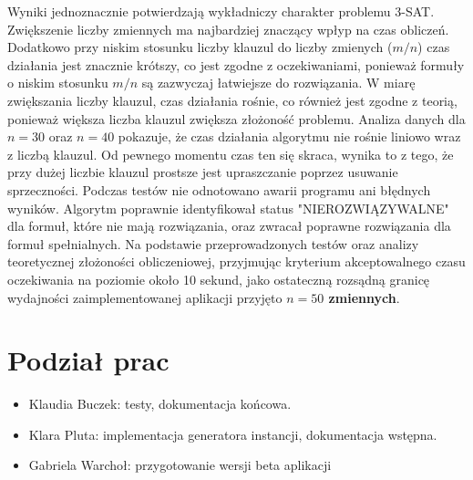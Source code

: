 \documentclass[11pt,a4paper]{article}
\theoremstyle{definition}
\begin{document}
Wyniki jednoznacznie potwierdzają wykładniczy charakter problemu 3-SAT. Zwiększenie liczby zmiennych ma najbardziej znaczący wpłyp na czas obliczeń. Dodatkowo przy niskim stosunku liczby klauzul do liczby zmienych ($m/n$) czas działania jest znacznie krótszy, co jest zgodne z oczekiwaniami, ponieważ formuły o niskim stosunku $m/n$ są zazwyczaj łatwiejsze do rozwiązania. W miarę zwiększania liczby klauzul, czas działania rośnie, co również jest zgodne z teorią, ponieważ większa liczba klauzul zwiększa złożoność problemu. \newline
Analiza danych dla $n=30$ oraz $n=40$ pokazuje, że czas działania algorytmu nie rośnie liniowo wraz z liczbą klauzul. Od pewnego momentu czas ten się skraca, wynika to z tego, że przy dużej liczbie klauzul prostsze jest upraszczanie poprzez usuwanie sprzeczności.\newline
Podczas testów nie odnotowano awarii programu ani błędnych wyników. Algorytm poprawnie identyfikował status "NIEROZWIĄZYWALNE" dla formuł, które nie mają rozwiązania, oraz zwracał poprawne rozwiązania dla formuł spełnialnych. \newline
Na podstawie przeprowadzonych testów oraz analizy teoretycznej złożoności obliczeniowej, przyjmując kryterium akceptowalnego czasu oczekiwania na poziomie około 10 sekund, jako ostateczną rozsądną granicę wydajności zaimplementowanej aplikacji przyjęto \textbf{$n = 50$ zmiennych}.

\section{Podział prac}
\begin{itemize}
    \item Klaudia Buczek: testy, dokumentacja końcowa.
    \item Klara Pluta: implementacja generatora instancji, dokumentacja wstępna.
    \item Gabriela Warchoł: przygotowanie wersji beta aplikacji
\end{itemize}
\end{document}
